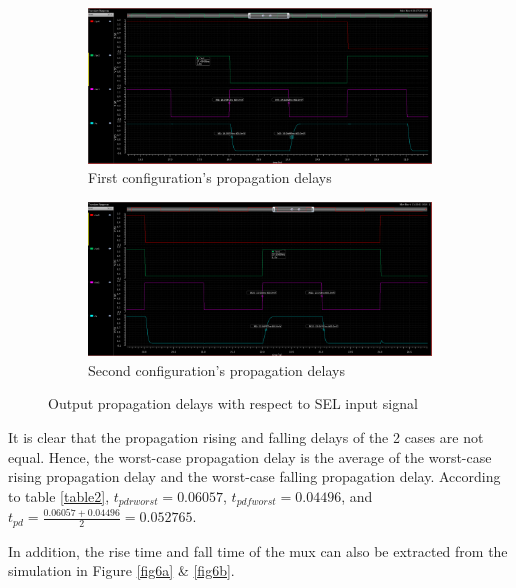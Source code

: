\documentclass[letterpaper, 11pt]{article}
\begin{document}
\begin{figure}[htb!]
	\centering
	\begin{subfigure}[htb]{.9\linewidth}
		\includegraphics[width=\textwidth]{mux_prop_delay_1.png}
		\caption{First configuration's propagation delays}
		\label{fig5a}
	\end{subfigure}
	\begin{subfigure}[htb]{.9\linewidth}
		\includegraphics[width=\textwidth]{mux_prop_delay_2.png}
		\caption{Second configuration's propagation delays}
		\label{fig5b}
	\end{subfigure}
	\caption{Output propagation delays with respect to SEL input signal}
\end{figure}


It is clear that the propagation rising and falling delays of the 2 cases are not equal. Hence, the worst-case propagation delay is the average of the worst-case rising propagation delay and the worst-case falling propagation delay. According to table \ref{table2}, $t_{pdr worst} = 0.06057$, $t_{pdf worst} = 0.04496$, and $t_{pd} = \frac{0.06057+0.04496}{2} = 0.052765$.

In addition, the rise time and fall time of the mux can also be extracted from the simulation in Figure \ref{fig6a} \& \ref{fig6b}.
\end{document}
